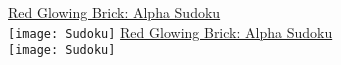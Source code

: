 \documentclass[white]{GL2020}
\begin{document}
\name{\wSudokuAlpha{}}

\vspace*{0.5cm}
\begin{center}
{\LARGE \underline{Red Glowing Brick: Alpha Sudoku}}\\
\vspace{0.5cm}
\texttt{[image: Sudoku]}
\vfill
{\LARGE \underline{Red Glowing Brick: Alpha Sudoku}}\\
\vspace{0.5cm}
\texttt{[image: Sudoku]}
\end{center}
\end{document}
